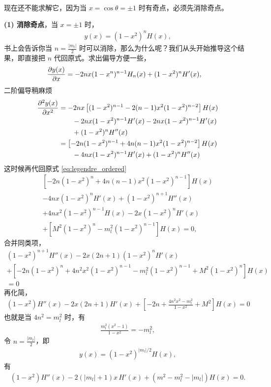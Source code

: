 现在还不能求解它，因为当 $x = \cos\theta = \pm1$ 时有奇点，必须先消除奇点。

\textbf{(1) 消除奇点}，当 $x = \pm 1$ 时，
\begin{align}
    y(x) = (1 - x^2)^n H(x),
\end{align}
书上会告诉你当 $n = \frac{|m_l|}2$ 时可以消除，那么为什么呢？我们从头开始推导这个结果，即直接把 $n$ 代回原式。求出偏导方便一些，
\begin{align}
    &\pdv{y(x)}{x} = -2n x (1-x^n)^{n-1} H_n(x) + (1-x^2)^n H'(x),
\end{align}
二阶偏导稍麻烦
\begin{align}
    \pdv[2]{y(x)}{x} &= -2n x \left[
        (1-x^2)^{n-1} - 2(n-1)x^2(1-x^2)^{n-2}
    \right]H(x)  \notag\\
    &\quad\quad
    - 2n x(1-x^2)^{n-1} H'(x) 
    - 2n x(1-x^2)^{n-1} H'(x) \notag\\
    &\quad\quad + (1-x^2)^n H''(x) \\
    & = \left[
        -2n (1-x^2)^{n-1} + 4n (n-1) x^2 (1-x^2)^{n-2}
    \right] H(x) \notag\\
    &\quad\quad - 4nx(1-x^2)^{n-1} H'(x) + 
    (1-x^2)^n H''(x)
\end{align}
这时候再代回原式 \eqref{eq:legendre_ordered}
\begin{multline}
    \left[
        -2n (1-x^2)^n + 4n(n-1) x^2 (1-x^2)^{n-1}
    \right] H(x) \\
    - 4nx(1-x^2)^n H'(x) + (1-x^2)^{n+1} H''(x) \\
    + 4nx^2 (1-x^2)^{n-1} H(x) 
    - 2x (1-x^2)^n H'(x) \\
    +\left[
        M^2 (1-x^2)^n - m_l^2 (1-x^2)^{n-1}
    \right] H(x) = 0,
\end{multline}
合并同类项，
\begin{multline}
    (1-x^2)^{n+1} H''(x) - 2x(2n+1) (1-x^2)^n H'(x) 
    \\+ 
    \left[
        -2n (1-x^2)^n + 4n^2 x^2 (1-x^2)^{n-1} - m_l^2 (1-x^2)^{n-1} + M^2 (1-x^2)^n
    \right] H(x) \\= 0
\end{multline}
再化简，
\begin{align}
    (1-x^2) H''(x) - 2x(2n+1) H'(x) + \left[
        -2n + \frac{4n^2x^2 - m_l^2}{1-x^2} + M^2
    \right] H(x) = 0
\end{align}
也就是当 $4n^2 = m_l^2$ 时，有
\begin{align}
    \frac{m_l^2 (x^2 - 1)}{1 - x^2} = - m_l^2,
\end{align}
令 $n = \frac{|m_l|}2$，即
\begin{align}
    y(x) = (1 - x^2)^{|m_l|/2} H(x),
\end{align}
有
\begin{align}
    (1-x^2) H''(x) - 2\left(|m_l| + 1\right)x \, H'(x) + \left(m^2 - m_l^2 - |m_l|\right) H(x) = 0. 
\end{align}

